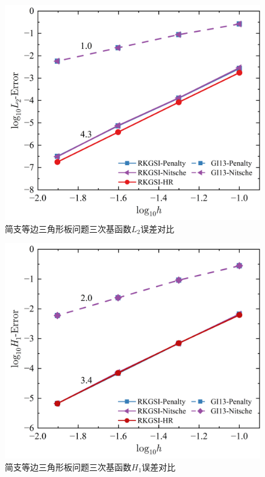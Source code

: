 \begin{figure}[H]
    \centering
    \includegraphics[scale=0.5]{figure/PHR/T/CL2.png}
    \caption{简支等边三角形板问题三次基函数$L_2$误差对比}\label{TCLH}
\end{figure}
\newpage
\begin{figure}[H]
    \centering
    \includegraphics[scale=0.5]{figure/PHR/T/CH1.png}
    \caption{简支等边三角形板问题三次基函数$H_1$误差对比}
\end{figure}
